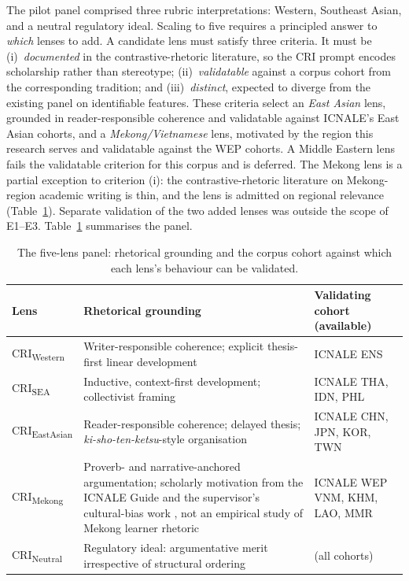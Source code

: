 The pilot panel comprised three rubric interpretations: Western,
Southeast Asian, and a neutral regulatory ideal. Scaling to five
requires a principled answer to \emph{which} lenses to add. A
candidate lens must satisfy three criteria. It must be (i)~\emph{documented} in the
contrastive-rhetoric literature, so the CRI prompt encodes
scholarship rather than stereotype; (ii)~\emph{validatable} against a
corpus cohort from the corresponding tradition; and
(iii)~\emph{distinct}, expected to diverge from the existing panel on
identifiable features. These criteria select an \emph{East Asian}
lens, grounded in reader-responsible coherence
\citep{hinds1987reader} and validatable against ICNALE's East Asian
cohorts, and a \emph{Mekong/Vietnamese} lens, motivated by the region
this research serves and validatable against the WEP cohorts. A
Middle Eastern lens fails the validatable criterion for this corpus
and is deferred. The Mekong lens is a partial exception to
criterion (i): the contrastive-rhetoric literature on Mekong-region
academic writing is thin, and the lens is admitted on regional
relevance (Table~\ref{tab:lens-panel}). Separate validation of the two added lenses was outside the scope
of E1--E3. Table~\ref{tab:lens-panel} summarises the panel.

\begin{table}[htbp]
\centering
\caption[The five-lens CAMPS panel]{The five-lens panel: rhetorical
grounding and the corpus cohort against which each lens's behaviour
can be validated.}
\label{tab:lens-panel}
\small
\begin{tabular}{p{2.9cm} p{5.6cm} p{3.6cm}}
\hline
Lens & Rhetorical grounding & Validating cohort (available) \\
\hline
CRI\textsubscript{Western} & Writer-responsible coherence; explicit
thesis-first linear development \citep{kaplan1966cultural,
connor2011intercultural} & ICNALE ENS \\[3pt]
CRI\textsubscript{SEA} & Inductive, context-first development;
collectivist framing \citep{connor2011intercultural,
ishikawa2023icnale} & ICNALE THA, IDN, PHL \\[3pt]
CRI\textsubscript{EastAsian} & Reader-responsible coherence; delayed
thesis; \emph{ki-sho-ten-ketsu}-style organisation
\citep{hinds1987reader} & ICNALE CHN, JPN, KOR, TWN \\[3pt]
CRI\textsubscript{Mekong} & Proverb- and narrative-anchored
argumentation; scholarly motivation from the ICNALE Guide and the
supervisor's cultural-bias work \citep{ishikawa2023icnale,
shujaa2026llms}, not an empirical study of Mekong learner rhetoric
& ICNALE WEP VNM, KHM, LAO, MMR \\[3pt]
CRI\textsubscript{Neutral} & Regulatory ideal: argumentative merit
irrespective of structural ordering \citep{fricker2007epistemic} &
(all cohorts) \\
\hline
\end{tabular}
\end{table}

